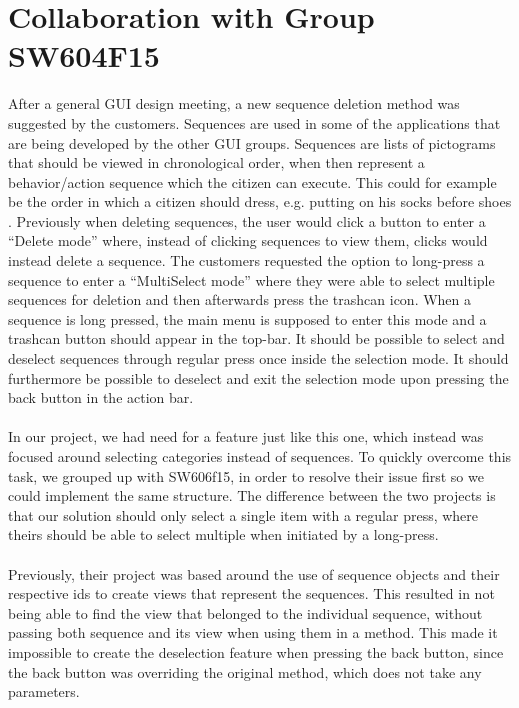 \section{Collaboration with Group SW604F15}
\label{sec:collaboration_with_group_sw604f15}


After a general GUI design meeting, a new sequence deletion method was suggested by the customers. Sequences are used in some of the applications that are being developed by the other GUI groups. Sequences are lists of pictograms that should be viewed in chronological order, when then represent a behavior/action sequence which the citizen can execute. This could for example be the order in which a citizen should dress, e.g. putting on his socks before shoes . Previously when deleting sequences, the user would click a button to enter a ``Delete mode'' where, instead of clicking sequences to view them, clicks would instead delete a sequence. The customers requested the option to long-press a sequence to enter a ``MultiSelect mode'' where they were able to select multiple sequences for deletion and then afterwards press the trashcan icon. When a sequence is long pressed, the main menu is supposed to enter this mode and a trashcan button should appear in the top-bar. It should be possible to select and deselect sequences through regular press once inside the selection mode. It should furthermore be possible to deselect and exit the selection mode upon pressing the back button in the action bar.
\\\\
In our project, we had need for a feature just like this one, which instead was focused around selecting categories instead of sequences. To quickly overcome this task, we grouped up with SW606f15, in order to resolve their issue first so we could implement the same structure. The difference between the two projects is that our solution should only select a single item with a regular press, where theirs should be able to select multiple when initiated by a long-press.
\\\\
Previously, their project was based around the use of sequence objects and their respective ids to create views that represent the sequences. This resulted in not being able to find the view that belonged to the individual sequence, without passing both sequence and its view when using them in a method. This made it impossible to create the deselection feature when pressing the back button, since the back button was overriding the original  method, which does not take any parameters.
